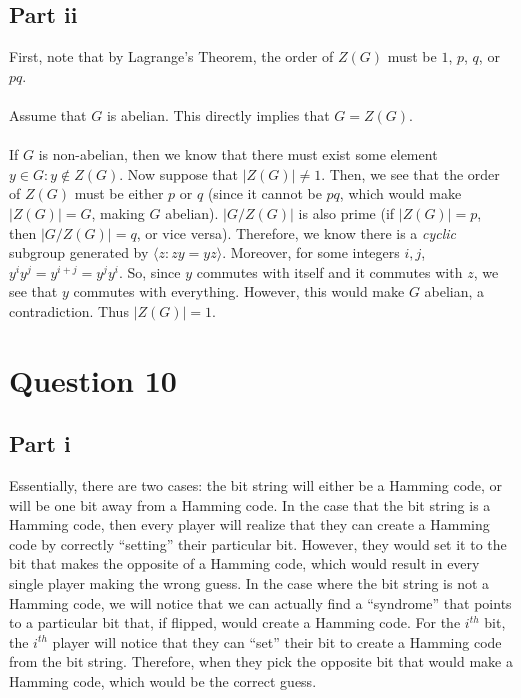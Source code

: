 \documentclass[letterpaper]{article}
\begin{document}
\subsection{Part ii}
\label{subsec:9Partii}

First, note that by Lagrange's Theorem, the order of $ Z(G) $ must be $ 1 $, $ p $, $ q $, or $ pq $.
\\ \\
Assume that $ G $ is abelian.
This directly implies that $ G = Z(G) $.
\\ \\
If $ G $ is non-abelian, then we know that there must exist some element $ y \in G : y \notin Z(G) $.
Now suppose that $ |Z(G)| \neq 1 $.
Then, we see that the order of $ Z(G) $ must be either $ p $ or $ q $ (since it cannot be $ pq $, which would make $ |Z(G)| = G $, making $ G $ abelian).
$ |G/Z(G)| $ is also prime (if $ |Z(G)| = p $, then $ |G/Z(G)| = q $, or vice versa).
Therefore, we know there is a \textit{cyclic} subgroup generated by $ \langle z : zy = yz \rangle $.
Moreover, for some integers $ i, j $, $ y^i y^j = y^{i + j} = y^j y^i $.
So, since $ y $ commutes with itself and it commutes with $ z $, we see that $ y $ commutes with everything.
However, this would make $ G $ abelian, a contradiction.
Thus $ |Z(G)| = 1 $.

\section{Question 10}
\label{sec:Question10}

\subsection{Part i}
\label{subsec:10Parti}

Essentially, there are two cases: the bit string will either be a Hamming code, or will be one bit away from a   Hamming code.
In the case that the bit string is a Hamming code, then every player will realize that they can create a Hamming code by correctly ``setting'' their particular bit.
However, they would set it to the bit that makes the opposite of a Hamming code, which would result in every single player making the wrong guess.
In the case where the bit string is not a Hamming code, we will notice that we can actually find a ``syndrome'' that points to a particular bit that, if flipped, would create a Hamming code.
For the $ i^{th} $ bit, the $ i^{th} $ player will notice that they can ``set'' their bit to create a Hamming code from the bit string.
Therefore, when they pick the opposite bit that would make a Hamming code, which would be the correct guess.
\end{document}
